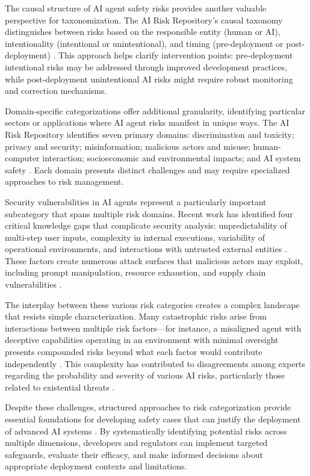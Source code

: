 \documentclass[conference]{IEEEtran}
\begin{document}
The causal structure of AI agent safety risks provides another valuable perspective for taxonomization. The AI Risk Repository's causal taxonomy distinguishes between risks based on the responsible entity (human or AI), intentionality (intentional or unintentional), and timing (pre-deployment or post-deployment) \cite{2408.12622}. This approach helps clarify intervention points: pre-deployment intentional risks may be addressed through improved development practices, while post-deployment unintentional AI risks might require robust monitoring and correction mechanisms.

Domain-specific categorizations offer additional granularity, identifying particular sectors or applications where AI agent risks manifest in unique ways. The AI Risk Repository identifies seven primary domains: discrimination and toxicity; privacy and security; misinformation; malicious actors and misuse; human-computer interaction; socioeconomic and environmental impacts; and AI system safety \cite{2408.12622}. Each domain presents distinct challenges and may require specialized approaches to risk management.

Security vulnerabilities in AI agents represent a particularly important subcategory that spans multiple risk domains. Recent work has identified four critical knowledge gaps that complicate security analysis: unpredictability of multi-step user inputs, complexity in internal executions, variability of operational environments, and interactions with untrusted external entities \cite{2406.02630}. These factors create numerous attack surfaces that malicious actors may exploit, including prompt manipulation, resource exhaustion, and supply chain vulnerabilities \cite{2504.19956}.

The interplay between these various risk categories creates a complex landscape that resists simple characterization. Many catastrophic risks arise from interactions between multiple risk factors—for instance, a misaligned agent with deceptive capabilities operating in an environment with minimal oversight presents compounded risks beyond what each factor would contribute independently \cite{2306.12001}. This complexity has contributed to disagreements among experts regarding the probability and severity of various AI risks, particularly those related to existential threats \cite{2502.14870}.

Despite these challenges, structured approaches to risk categorization provide essential foundations for developing safety cases that can justify the deployment of advanced AI systems \cite{2403.10462}. By systematically identifying potential risks across multiple dimensions, developers and regulators can implement targeted safeguards, evaluate their efficacy, and make informed decisions about appropriate deployment contexts and limitations.
\end{document}
